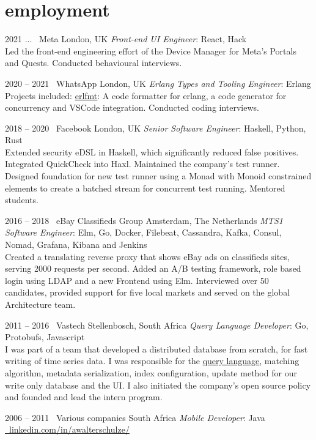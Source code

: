 \documentclass[print]{friggeri-cv-a4} %
\begin{document}
\section{employment}
\begin{entrylist}

\entry
{2021 ...}
{\infty\ Meta}
{London, UK}
{\emph{Front-end UI Engineer}: React, Hack \\
Led the front-end engineering effort of the Device Manager for Meta's \newline Portals and Quests. Conducted behavioural interviews.
}

\entry
{2020 -- 2021}
{\faWhatsapp\ WhatsApp}
{London, UK}
{\emph{Erlang Types and Tooling Engineer}: Erlang \\
Projects included: \href{https://github.com/whatsapp/erlfmt}{erlfmt}: A code formatter for erlang, a code generator for concurrency and VSCode integration. Conducted coding interviews.
}

\entry
{2018 -- 2020}
{\faFacebookSquare\ Facebook}
{London, UK}
{\emph{Senior Software Engineer}: Haskell, Python, Rust \\
Extended security eDSL in Haskell, which significantly reduced false positives. Integrated QuickCheck into Haxl.
Maintained the company's test runner. Designed foundation for new test runner using a Monad with Monoid constrained elements to create a batched stream for concurrent test running.  Mentored students.
}

\entry
{2016 -- 2018}
{\faShoppingBasket\ eBay Classifieds Group}
{Amsterdam, The Netherlands}
{\emph{MTS1 Software Engineer}: Elm, Go, Docker, Filebeat, Cassandra, Kafka, Consul, Nomad, Grafana, Kibana and Jenkins \\
Created a translating reverse proxy that shows eBay ads on classifieds sites, serving 2000 requests per second. Added an A/B testing framework, role based login using LDAP and a new Frontend using Elm. Interviewed over 50 candidates, provided support for five local markets and served on the global Architecture team.
}

\entry
{2011 -- 2016}
{\faHeadphones\ Vastech}
{Stellenbosch, South Africa}
{\emph{Query Language Developer}: Go, Protobufs, Javascript \\
I was part of a team that developed a distributed database from scratch, for fast writing of time series data. I was responsible for the \href{https://github.com/katydid/katydid}{query language}, matching algorithm, metadata serialization, index configuration, update method for our write only database and the UI. I also initiated the company's open source policy and founded and lead the intern program.
}

\entry
{2006 -- 2011}
{\faMobile\ Various companies}
{South Africa}
{\emph{Mobile Developer}: Java \\
\href{https://www.linkedin.com/in/awalterschulze/}{\faLinkedinSquare\ linkedin.com/in/awalterschulze/}
}

\end{entrylist}
\end{document}
